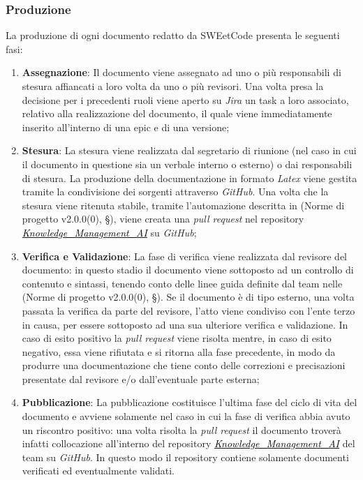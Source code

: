 \documentclass[10pt, a4paper]{article}
\begin{document}
\subsubsection{Produzione}
\label{sec:ciclo_vita}
La produzione di ogni documento redatto da SWEetCode presenta le seguenti fasi:
\begin{enumerate}
    \item \textbf{Assegnazione}: Il documento viene assegnato ad uno o più responsabili di stesura affiancati a loro volta da uno o più revisori.
    Una volta presa la decisione per i precedenti ruoli viene aperto su \textit{Jira} un task a loro associato, relativo alla  realizzazione del documento, il quale viene immediatamente inserito all'interno di una epic e di una versione;
    \item \textbf{Stesura}: La stesura viene realizzata dal segretario di riunione (nel caso in cui il documento in questione sia un verbale 
    interno o esterno) o dai responsabili di stesura.
    La produzione della documentazione in formato \textit{Latex} viene gestita tramite la condivisione dei sorgenti attraverso \textit{GitHub}. 
    Una volta che la stesura viene ritenuta stabile, tramite l'automazione descritta in (Norme di progetto v2.0.0(0), \S {}), viene creata una \textit{pull request} nel repository \href{https://github.com/sweetcode-team/Knowledge_Management_AI}{\textcolor{black}{\textit{Knowledge\_Management\_AI}}} su \textit{GitHub};
    \item \textbf{Verifica e Validazione}: La fase di verifica viene realizzata dal revisore del documento: in questo stadio il documento viene 
    sottoposto ad un controllo di contenuto e sintassi, tenendo conto delle linee guida definite dal team nelle (Norme di progetto v2.0.0(0), \S {}). 
    Se il documento è di tipo esterno, una volta passata la verifica da parte del revisore, l'atto viene condiviso con l'ente terzo in causa, 
    per essere sottoposto ad una sua ulteriore verifica e validazione.
    In caso di esito positivo la \textit{pull request} viene risolta mentre, in caso di esito negativo, essa viene rifiutata e si ritorna alla 
    fase precedente, in modo da produrre una documentazione che tiene conto delle correzioni e precisazioni presentate dal revisore e/o 
    dall'eventuale parte esterna;
    \item \textbf{Pubblicazione}: La pubblicazione costituisce l'ultima fase del ciclo di vita del documento e avviene solamente nel caso in cui 
    la fase di verifica abbia avuto un riscontro positivo: una volta risolta la \textit{pull request} il documento troverà infatti collocazione 
    all'interno del repository \href{https://github.com/sweetcode-team/Knowledge_Management_AI}{\textcolor{black}{\textit{Knowledge\_Management\_AI}}} 
    del team su \textit{GitHub}. In questo modo il repository contiene solamente documenti verificati ed eventualmente validati.
\end{enumerate}
\end{document}
